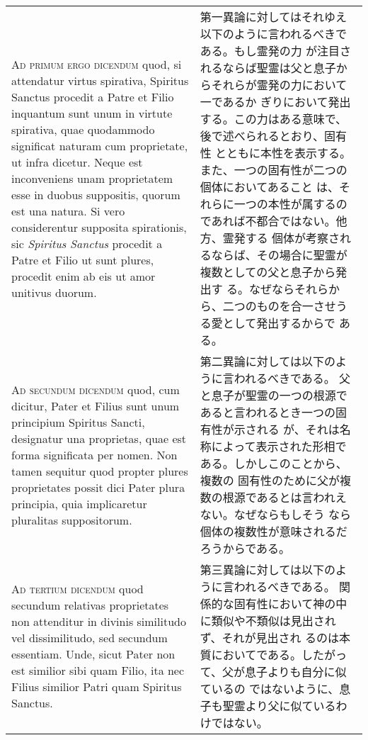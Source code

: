 \documentclass[10pt]{jsarticle} %
\begin{document}
\begin{longtable}{p{21em}p{21em}}
{\scshape Ad primum ergo dicendum} quod, si attendatur virtus spirativa,
Spiritus Sanctus procedit a Patre et Filio inquantum sunt
unum in virtute spirativa, quae quodammodo significat naturam cum
proprietate, ut infra dicetur. Neque est inconveniens unam
proprietatem esse in duobus suppositis, quorum est una natura. Si vero
considerentur supposita spirationis, sic {\itshape  Spiritus Sanctus}
procedit a Patre et Filio ut sunt plures, procedit enim ab eis ut amor
unitivus duorum.

&

第一異論に対してはそれゆえ以下のように言われるべきである。もし霊発の力
が注目されるならば聖霊は父と息子からそれらが霊発の力において一であるか
ぎりにおいて発出する。この力はある意味で、後で述べられるとおり、固有性
とともに本性を表示する。また、一つの固有性が二つの個体においてあること
は、それらに一つの本性が属するのであれば不都合ではない。他方、霊発する
個体が考察されるならば、その場合に聖霊が複数としての父と息子から発出す
る。なぜならそれらから、二つのものを合一させうる愛として発出するからで
ある。

\\



{\scshape Ad secundum dicendum} quod, cum dicitur, Pater et Filius sunt unum
principium  Spiritus Sancti, designatur una proprietas, quae est forma
significata per nomen. Non tamen sequitur quod propter plures
proprietates possit dici Pater plura principia, quia implicaretur
pluralitas suppositorum.

&

第二異論に対しては以下のように言われるべきである。
父と息子が聖霊の一つの根源であると言われるとき一つの固有性が示される
が、それは名称によって表示された形相である。しかしこのことから、複数の
 固有性のために父が複数の根源であるとは言われえない。なぜならもしそう
 なら個体の複数性が意味されるだろうからである。

\\



{\scshape Ad tertium dicendum} quod secundum relativas proprietates non
attenditur in divinis similitudo vel dissimilitudo, sed secundum
essentiam. Unde, sicut Pater non est similior sibi quam Filio, ita nec
Filius similior Patri quam Spiritus Sanctus.

&

第三異論に対しては以下のように言われるべきである。
関係的な固有性において神の中に類似や不類似は見出されず、それが見出され
 るのは本質においてである。したがって、父が息子よりも自分に似ているの
 ではないように、息子も聖霊より父に似ているわけではない。


\end{longtable}
\end{document}
